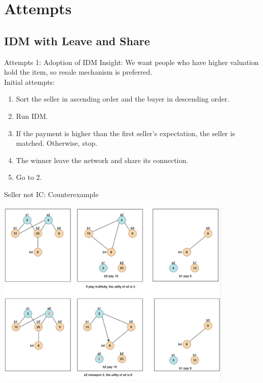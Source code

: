 \documentclass{beamer}
\begin{document}
\section{Attempts}
\subsection{IDM with Leave and Share}
\begin{frame}{Attempts 1: Adoption of IDM}
	Insight:
	We want people who have higher valuation hold the item,
	so resale mechanism is preferred.\\\pause
	Initial attempts:
	\begin{enumerate}
		\item Sort the seller in ascending order and the buyer in descending order.
		\item Run IDM.
		\item If the payment is higher than the first seller's expectation, the seller is matched.
		      Otherwise, stop.
		\item The winner leave the network and share its connection.
		\item Go to 2.
	\end{enumerate}
\end{frame}
\begin{frame}{Seller not IC: Counterexample}
	\begin{center}
		\includegraphics[width=0.85\textwidth]{IDMCounter1}
	\end{center}
\end{frame}
\end{document}

